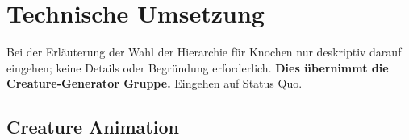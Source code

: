 \chapter{Technische Umsetzung}
Bei der Erläuterung der Wahl der Hierarchie für Knochen nur deskriptiv darauf eingehen; keine Details oder Begründung erforderlich. \textbf{Dies übernimmt die Creature-Generator Gruppe.}
Eingehen auf Status Quo.
\section{Creature Animation}
